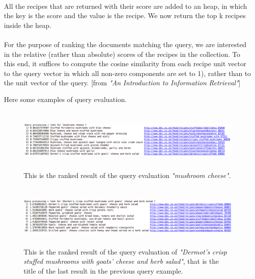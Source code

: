 \documentclass[oneside]{article}			%
\begin{document}
	\\
	All the recipes that are returned with their score are added to an heap, in which the key is the score and the value is the recipe. We now return the top k recipes inside the heap.
	\\\\
	For the purpose of ranking the documents matching the query, we are interested in the relative (rather than absolute) scores of the recipes in the collection. To this end, it suffices to compute the cosine similarity from each recipe unit vector to the query vector in which all non-zero components are set to 1), rather than to the unit vector of the query. [from \textit{"An Introduction to Information Retrieval"}]

	\clearpage
	Here some examples of query evaluation.
	\\
	\begin{figure}[h]
		\includegraphics[width=18cm, height=3.1cm]{./report_file/img/4_3_1_ex.png}\caption{This is the ranked result of the query evaluation \textit{"mushroom cheese"}.}
	\end{figure}
	\begin{figure}[h]
		\includegraphics[width=18cm, height=3.1cm]{./report_file/img/4_3_2_ex.png}\caption{This is the ranked result of the query evaluation of \textit{"Dermot's crisp stuffed mushrooms with goats' cheese and herb salad"}, that is the title of the last result in the previous query example.}
	\end{figure}
\end{document}
